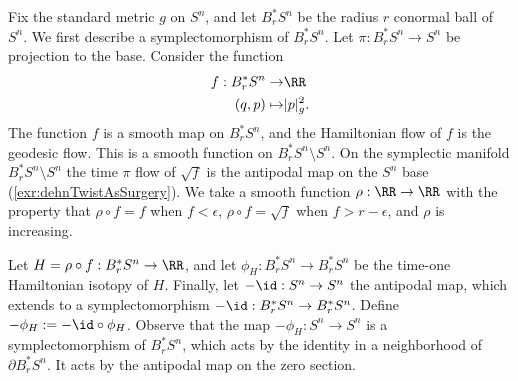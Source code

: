 

    Fix the standard metric $g$ on $S^n$, and let $B_r^*S^{n}$ be the radius  $r$ conormal ball of $S^n$. 
    We first describe a symplectomorphism of $B_r^*S^n$. Let $\pi: B^*_rS^n\to S^n$ be projection to the base.
    Consider the function 
    \begin{align*}
        f: B_r^*S^{n}\to& \RR\\
        (q, p) \mapsto& |p|_g^2.
    \end{align*}
    The function $f$ is a smooth map on $B_r^*S^n$, and the Hamiltonian flow of $f$ is the geodesic flow. 
    This is a smooth function on $B^*_rS^n\setminus S^n$. 
    On the symplectic manifold $B^*_rS^n\setminus S^n$ the time $\pi$ flow of $\sqrt{f}$ is the antipodal map on the $S^n$ base (\cref{exr:dehnTwistAsSurgery}). 
    We take a smooth function $\rho: \RR\to \RR$ with the property that $\rho \circ f = f$ when $f< \epsilon$, $\rho\circ f=\sqrt f$ when $f>r-\epsilon$, and $\rho$ is increasing. 

    
    
    Let $H= \rho \circ f: B^*_rS^n\to \RR$, and let $\phi_H: B_r^*S^n\to B_r^*S^n$ be the time-one Hamiltonian isotopy of $H$. 
    Finally, let $-\id: S^n\to S^n$ the antipodal map, which extends to a symplectomorphism $-\id: B_r^*S^n\to B_r^*S^n$. 
    Define $-\phi_H:=-\id\circ \phi_H$. 
    Observe that the map $-\phi_H: S^n\to S^n$ is a symplectomorphism of $B_r^*{S^n}$, which acts by the identity in a neighborhood of $\partial B_r^*S^{n}$.
    It acts by the antipodal map on the zero section.
